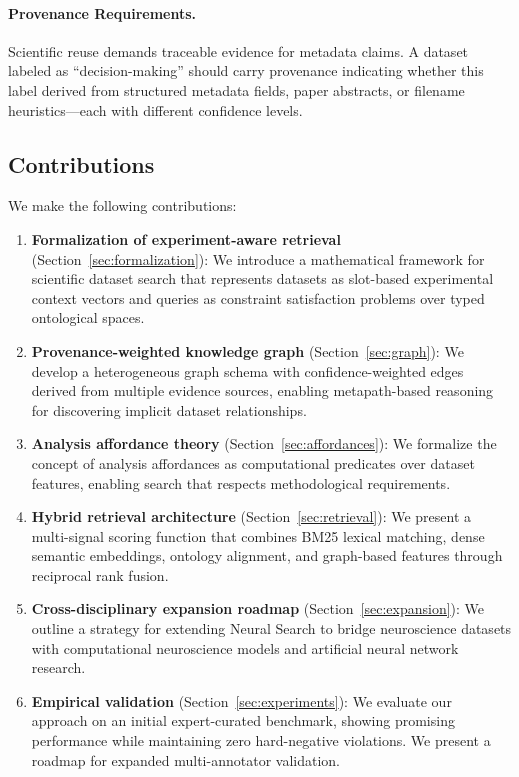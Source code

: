 \documentclass{article}
\theoremstyle{definition}
\begin{document}
\paragraph{Provenance Requirements.} Scientific reuse demands traceable evidence for metadata claims. A dataset labeled as ``decision-making'' should carry provenance indicating whether this label derived from structured metadata fields, paper abstracts, or filename heuristics---each with different confidence levels.

\subsection{Contributions}

We make the following contributions:

\begin{enumerate}
    \item \textbf{Formalization of experiment-aware retrieval} (Section~\ref{sec:formalization}): We introduce a mathematical framework for scientific dataset search that represents datasets as slot-based experimental context vectors and queries as constraint satisfaction problems over typed ontological spaces.

    \item \textbf{Provenance-weighted knowledge graph} (Section~\ref{sec:graph}): We develop a heterogeneous graph schema with confidence-weighted edges derived from multiple evidence sources, enabling metapath-based reasoning for discovering implicit dataset relationships.

    \item \textbf{Analysis affordance theory} (Section~\ref{sec:affordances}): We formalize the concept of analysis affordances as computational predicates over dataset features, enabling search that respects methodological requirements.

    \item \textbf{Hybrid retrieval architecture} (Section~\ref{sec:retrieval}): We present a multi-signal scoring function that combines BM25 lexical matching, dense semantic embeddings, ontology alignment, and graph-based features through reciprocal rank fusion.

    \item \textbf{Cross-disciplinary expansion roadmap} (Section~\ref{sec:expansion}): We outline a strategy for extending Neural Search to bridge neuroscience datasets with computational neuroscience models and artificial neural network research.

    \item \textbf{Empirical validation} (Section~\ref{sec:experiments}): We evaluate our approach on an initial expert-curated benchmark, showing promising performance while maintaining zero hard-negative violations. We present a roadmap for expanded multi-annotator validation.
\end{enumerate}
\end{document}
